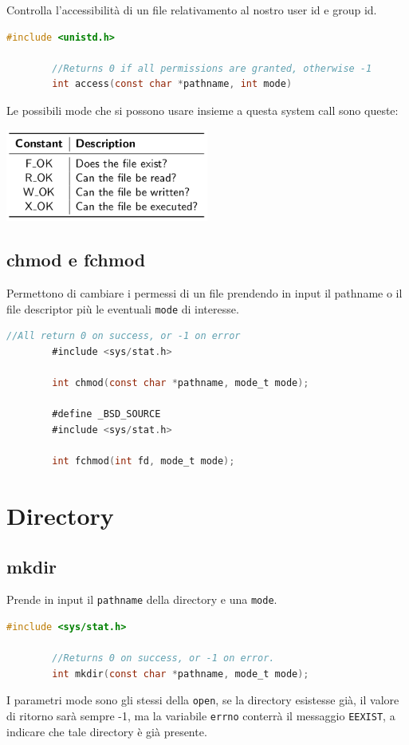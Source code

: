 \documentclass[a4paper, 12pt]{book}
\begin{document}
    Controlla l'accessibilità di un file relativamento 
    al nostro user id e group id.
    \begin{lstlisting}[language=C]
        #include <unistd.h>

        //Returns 0 if all permissions are granted, otherwise -1
        int access(const char *pathname, int mode)
    \end{lstlisting}
    Le possibili mode che si possono usare insieme 
    a questa system call sono queste:
    \begin{center}
        \includegraphics[width=0.5\textwidth]{access.png}
    \end{center}

    \subsection{chmod e fchmod}

    Permettono di cambiare i permessi di un file prendendo
    in input il pathname o il file descriptor più le eventuali
    \verb|mode| di interesse.
    \begin{lstlisting}[language=C]
        //All return 0 on success, or -1 on error
        #include <sys/stat.h>

        int chmod(const char *pathname, mode_t mode);

        #define _BSD_SOURCE
        #include <sys/stat.h>

        int fchmod(int fd, mode_t mode);
    \end{lstlisting}

    \section{Directory}

    \subsection{mkdir}

    Prende in input il \verb|pathname| della directory e 
    una \verb|mode|.
    \begin{lstlisting}[language=C]
        #include <sys/stat.h>

        //Returns 0 on success, or -1 on error.
        int mkdir(const char *pathname, mode_t mode);
    \end{lstlisting}
    I parametri mode sono gli stessi della \verb|open|,
    se la directory esistesse già, il valore di ritorno sarà 
    sempre -1, ma la variabile \verb|errno| conterrà 
    il messaggio \verb|EEXIST|, a indicare che tale 
    directory è già presente.
\end{document}
